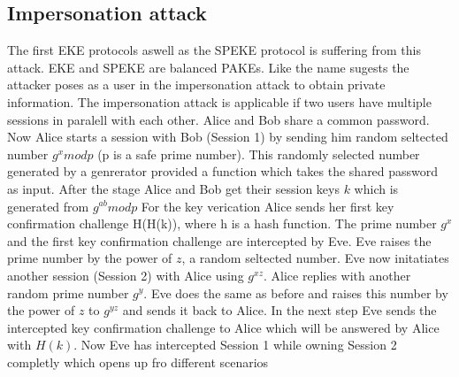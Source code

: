 \documentclass[journal]{IEEEtran}
\begin{document}
\subsection{Impersonation attack}
The first EKE protocols aswell as the SPEKE protocol is suffering from this attack.
EKE and SPEKE are balanced PAKEs.
Like the name sugests the attacker poses as a user in the impersonation attack to obtain private information. 
The impersonation attack is applicable if two users have multiple sessions in paralell with each other.
Alice and Bob share a common password. Now Alice starts a session with Bob (Session 1) by sending him random seltected number $g^x mod p$ (p is a safe prime number).
This randomly selected number generated by a genrerator provided a function which takes the shared password as input.
After the stage Alice and Bob get their session keys $k$ which is generated from $g^{ab} mod p$ 
For the key verication Alice sends her first key confirmation challenge H(H(k)), where h is a hash function.
The prime number $g^x$ and the first key confirmation challenge are intercepted by Eve. Eve raises the prime number by the power of $z$, a random seltected number.
Eve now initatiates another session (Session 2) with Alice using $g^{xz}$. Alice replies with another random prime number $g^y$.
Eve does the same as before and raises this number by the power of $z$ to $g^{yz}$ and sends it back to Alice.
In the next step Eve sends the intercepted key confirmation challenge to Alice which will be answered by Alice with $H(k)$.
Now Eve has intercepted Session 1 while owning Session 2 completly which opens up fro different scenarios 
\end{document}
